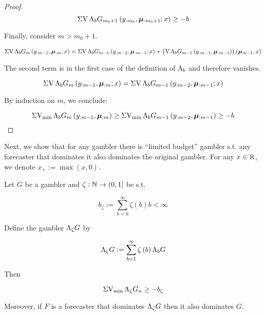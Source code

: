 \begin{proof}
$$\operatorname{\Sigma V} \Lambda_b G_{m_0+1}\left(y_{:m_0},\bm{\mu}_{:m_0+1};x\right) \geq -b$$

Finally, consider ${m > m_0 + 1}$.

$$\operatorname{\Sigma V} \Lambda_b G_{m}\left(y_{:m-1},\bm{\mu}_{:m};x\right) = \operatorname{\Sigma V} \Lambda_b G_{m-1}\left(y_{:m-2},\bm{\mu}_{:m-1};x\right) + \left(\operatorname{V} \Lambda_b G_{m-1}\left(y_{:m-1},\bm{\mu}_{:m-1}\right)\right)\left(\bm{\mu}_{m-1},x\right)$$

The second term is in the first case of the definition of $\Lambda_b$ and therefore vanishes.

$$\operatorname{\Sigma V} \Lambda_b G_{m}\left(y_{:m-1},\bm{\mu}_{:m};x\right) = \operatorname{\Sigma V} \Lambda_b G_{m-1}\left(y_{:m-2},\bm{\mu}_{:m-1};x\right)$$

By induction on ${m}$, we conclude:

$$\operatorname{\Sigma V_{\min}} \Lambda_b G_{m}\left(y_{:m-1},\bm{\mu}_{:m}\right) \geq \operatorname{\Sigma V_{\min}} \Lambda_b G_{m-1}\left(y_{:m-2},\bm{\mu}_{:m-1}\right) \geq -b$$
\end{proof}

Next, we show that for any gambler there is \enquote{limited budget} gambler s.t. any forecaster that dominates it also dominates the original gambler. For any $x \in \mathbb{R}$, we denote $x_+:=\max(x,0)$.

\begin{proposition}
\label{prp:frugal_gambler}

Let $G$ be a gambler and $\zeta: \mathbb{N} \rightarrow (0,1]$ be s.t.

\begin{equation}
b_\zeta := \sum_{b=0}^\infty \zeta\left(b\right) b < \infty
\end{equation}

Define the gambler $\Lambda_\zeta G$ by

\begin{equation}
\Lambda_\zeta G := \sum_{b = 1}^\infty \zeta\left(b\right) \Lambda_b G
\end{equation}

Then

\begin{equation}
\label{eqn:prp_furgal_gambler__svm_b_zeta}
\operatorname{\Sigma V_{\min}} \Lambda_\zeta G_n \geq -b_\zeta
\end{equation}

Moreover, if $F$ is a forecaster that dominates $\Lambda_\zeta G$ then it also dominates $G$.

\end{proposition}

